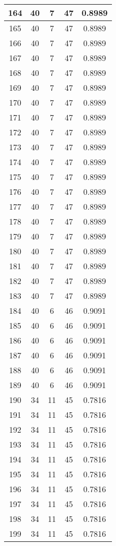 \documentclass[letterpaper, 12pt]{article}
\begin{document}
\begin{longtable}{|c|c|c|c|c|}
\hline
164 & 40 & 7 & 47 & 0.8989 \\
\hline
165 & 40 & 7 & 47 & 0.8989 \\
\hline
166 & 40 & 7 & 47 & 0.8989 \\
\hline
167 & 40 & 7 & 47 & 0.8989 \\
\hline
168 & 40 & 7 & 47 & 0.8989 \\
\hline
169 & 40 & 7 & 47 & 0.8989 \\
\hline
170 & 40 & 7 & 47 & 0.8989 \\
\hline
171 & 40 & 7 & 47 & 0.8989 \\
\hline
172 & 40 & 7 & 47 & 0.8989 \\
\hline
173 & 40 & 7 & 47 & 0.8989 \\
\hline
174 & 40 & 7 & 47 & 0.8989 \\
\hline
175 & 40 & 7 & 47 & 0.8989 \\
\hline
176 & 40 & 7 & 47 & 0.8989 \\
\hline
177 & 40 & 7 & 47 & 0.8989 \\
\hline
178 & 40 & 7 & 47 & 0.8989 \\
\hline
179 & 40 & 7 & 47 & 0.8989 \\
\hline
180 & 40 & 7 & 47 & 0.8989 \\
\hline
181 & 40 & 7 & 47 & 0.8989 \\
\hline
182 & 40 & 7 & 47 & 0.8989 \\
\hline
183 & 40 & 7 & 47 & 0.8989 \\
\hline
184 & 40 & 6 & 46 & 0.9091 \\
\hline
185 & 40 & 6 & 46 & 0.9091 \\
\hline
186 & 40 & 6 & 46 & 0.9091 \\
\hline
187 & 40 & 6 & 46 & 0.9091 \\
\hline
188 & 40 & 6 & 46 & 0.9091 \\
\hline
189 & 40 & 6 & 46 & 0.9091 \\
\hline
190 & 34 & 11 & 45 & 0.7816 \\
\hline
191 & 34 & 11 & 45 & 0.7816 \\
\hline
192 & 34 & 11 & 45 & 0.7816 \\
\hline
193 & 34 & 11 & 45 & 0.7816 \\
\hline
194 & 34 & 11 & 45 & 0.7816 \\
\hline
195 & 34 & 11 & 45 & 0.7816 \\
\hline
196 & 34 & 11 & 45 & 0.7816 \\
\hline
197 & 34 & 11 & 45 & 0.7816 \\
\hline
198 & 34 & 11 & 45 & 0.7816 \\
\hline
199 & 34 & 11 & 45 & 0.7816 \\
\hline
\end{longtable}
\end{document}
